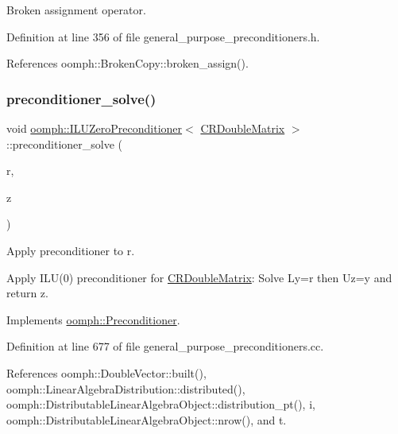 Broken assignment operator. 



Definition at line 356 of file general\+\_\+purpose\+\_\+preconditioners.\+h.



References oomph\+::\+Broken\+Copy\+::broken\+\_\+assign().

\mbox{\label{classoomph_1_1ILUZeroPreconditioner_3_01CRDoubleMatrix_01_4_ae0bff88ef761683c868110347c6d81db}} 
\subsubsection{\texorpdfstring{preconditioner\+\_\+solve()}{preconditioner\_solve()}}
{\footnotesize\ttfamily void \hyperlink{classoomph_1_1ILUZeroPreconditioner}{oomph\+::\+I\+L\+U\+Zero\+Preconditioner}$<$ \hyperlink{classoomph_1_1CRDoubleMatrix}{C\+R\+Double\+Matrix} $>$\+::preconditioner\+\_\+solve (\begin{DoxyParamCaption}\item[{const \hyperlink{classoomph_1_1DoubleVector}{Double\+Vector} \&}]{r,  }\item[{\hyperlink{classoomph_1_1DoubleVector}{Double\+Vector} \&}]{z }\end{DoxyParamCaption})\hspace{0.3cm}{\ttfamily [virtual]}}



Apply preconditioner to r. 

Apply I\+L\+U(0) preconditioner for \hyperlink{classoomph_1_1CRDoubleMatrix}{C\+R\+Double\+Matrix}\+: Solve Ly=r then Uz=y and return z. 

Implements \hyperlink{classoomph_1_1Preconditioner_ace1199369e4465cd2b9a34884bb64ec8}{oomph\+::\+Preconditioner}.



Definition at line 677 of file general\+\_\+purpose\+\_\+preconditioners.\+cc.



References oomph\+::\+Double\+Vector\+::built(), oomph\+::\+Linear\+Algebra\+Distribution\+::distributed(), oomph\+::\+Distributable\+Linear\+Algebra\+Object\+::distribution\+\_\+pt(), i, oomph\+::\+Distributable\+Linear\+Algebra\+Object\+::nrow(), and t.

